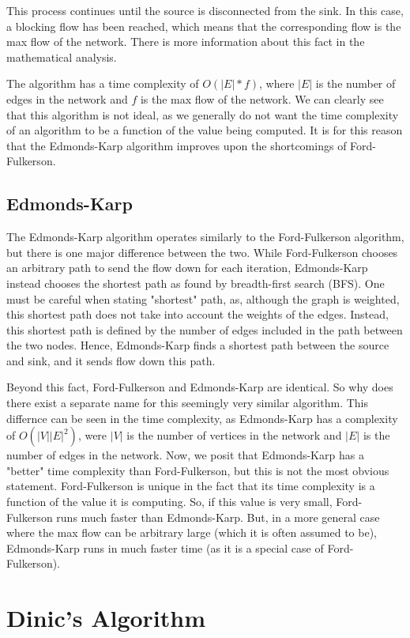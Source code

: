 \documentclass{report}
\begin{document}
This process continues until the source is disconnected from the sink. In this case, a blocking flow has been reached, which means that the corresponding flow is the max flow of the network. There is more information about this fact in the mathematical analysis.

The algorithm has a time complexity of $O(|E|*f)$, where $|E|$ is the number of edges in the network and $f$ is the max flow of the network. We can clearly see that this algorithm is not ideal, as we generally do not want the time complexity of an algorithm to be a function of the value being computed. It is for this reason that the Edmonds-Karp algorithm improves upon the shortcomings of Ford-Fulkerson.

\section{Edmonds-Karp}
The Edmonds-Karp algorithm operates similarly to the Ford-Fulkerson algorithm, but there is one major difference between the two. While Ford-Fulkerson chooses an arbitrary path to send the flow down for each iteration, Edmonds-Karp instead chooses the shortest path as found by breadth-first search (BFS). One must be careful when stating "shortest" path, as, although the graph is weighted, this shortest path does not take into account the weights of the edges. Instead, this shortest path is defined by the number of edges included in the path between the two nodes. Hence, Edmonds-Karp finds a shortest path between the source and sink, and it sends flow down this path.

Beyond this fact, Ford-Fulkerson and Edmonds-Karp are identical. So why does there exist a separate name for this seemingly very similar algorithm. This differnce can be seen in the time complexity, as Edmonds-Karp has a complexity of $O(|V||E|^2)$, were $|V|$ is the number of vertices in the network and $|E|$ is the number of edges in the network. Now, we posit that Edmonds-Karp has a "better" time complexity than Ford-Fulkerson, but this is not the most obvious statement. Ford-Fulkerson is unique in the fact that its time complexity is a function of the value it is computing. So, if this value is very small, Ford-Fulkerson runs much faster than Edmonds-Karp. But, in a more general case where the max flow can be arbitrary large (which it is often assumed to be), Edmonds-Karp runs in much faster time (as it is a special case of Ford-Fulkerson).

\chapter{Dinic's Algorithm}
\end{document}
